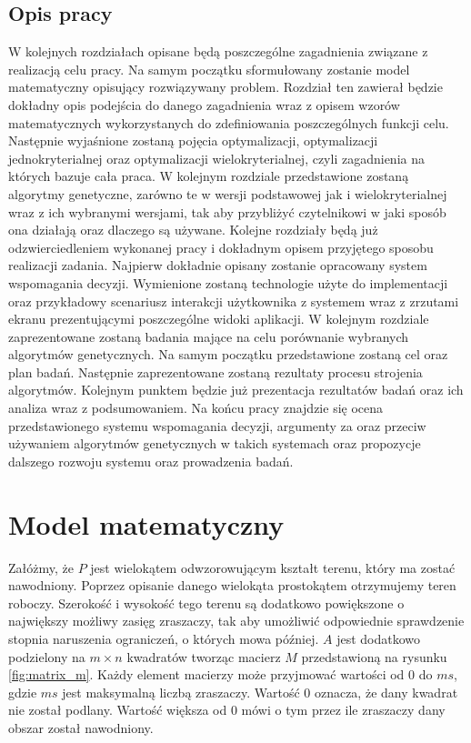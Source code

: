 \documentclass[twoside]{iisthesis}
\begin{document}
\section{Opis pracy}
W kolejnych rozdziałach opisane będą poszczególne zagadnienia związane z realizacją celu pracy. Na samym początku sformułowany zostanie model matematyczny opisujący rozwiązywany problem. Rozdział ten zawierał będzie dokładny opis podejścia do danego zagadnienia wraz z opisem wzorów matematycznych wykorzystanych do zdefiniowania poszczególnych funkcji celu. Następnie wyjaśnione zostaną pojęcia optymalizacji, optymalizacji jednokryterialnej oraz optymalizacji wielokryterialnej, czyli zagadnienia na których bazuje cała praca. W kolejnym rozdziale przedstawione zostaną algorytmy genetyczne, zarówno te w wersji podstawowej jak i wielokryterialnej wraz z ich wybranymi wersjami, tak aby przybliżyć czytelnikowi w jaki sposób ona działają oraz dlaczego są używane. Kolejne rozdziały będą już odzwierciedleniem wykonanej pracy i dokładnym opisem przyjętego sposobu realizacji zadania. Najpierw dokładnie opisany zostanie opracowany system wspomagania decyzji. Wymienione zostaną technologie użyte do implementacji oraz przykładowy scenariusz interakcji użytkownika z systemem wraz z zrzutami ekranu prezentującymi poszczególne widoki aplikacji. W kolejnym rozdziale zaprezentowane zostaną badania mające na celu porównanie wybranych algorytmów genetycznych. Na samym początku przedstawione zostaną cel oraz plan badań. Następnie zaprezentowane zostaną rezultaty procesu strojenia algorytmów. Kolejnym punktem będzie już prezentacja rezultatów badań oraz ich analiza wraz z podsumowaniem. Na końcu pracy znajdzie się ocena przedstawionego systemu wspomagania decyzji, argumenty za oraz przeciw używaniem algorytmów genetycznych w takich systemach oraz propozycje dalszego rozwoju systemu oraz prowadzenia badań.

\chapter{Model matematyczny}
Załóżmy, że $P$ jest wielokątem odwzorowującym kształt terenu, który ma zostać nawodniony. Poprzez opisanie danego wielokąta prostokątem otrzymujemy teren roboczy. Szerokość i wysokość tego terenu są dodatkowo powiększone o największy możliwy zasięg zraszaczy, tak aby umożliwić odpowiednie sprawdzenie stopnia naruszenia ograniczeń, o których mowa później. $A$ jest dodatkowo podzielony na $m \times n$ kwadratów tworząc macierz $M$ przedstawioną na rysunku \eqref{fig:matrix_m}. Każdy element macierzy może przyjmować wartości od 0 do $ms$, gdzie $ms$ jest maksymalną liczbą zraszaczy. Wartość 0 oznacza, że dany kwadrat nie został podlany. Wartość większa od 0 mówi o tym przez ile zraszaczy dany obszar został nawodniony.
\end{document}
